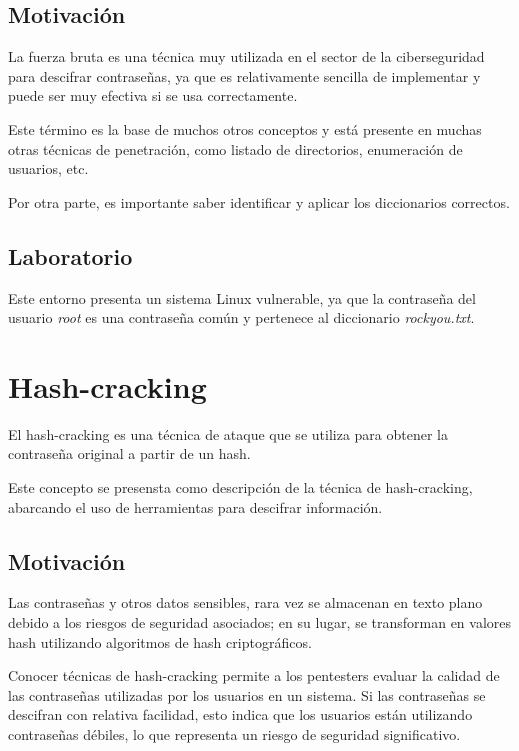         \subsection{Motivación}

            La fuerza bruta es una técnica muy utilizada en el sector de la ciberseguridad para descifrar contraseñas, ya que es relativamente sencilla de implementar y puede ser muy efectiva si se usa correctamente.

            Este término es la base de muchos otros conceptos y está presente en muchas otras técnicas de penetración, como listado de directorios, enumeración de usuarios, etc.

            Por otra parte, es importante saber identificar y aplicar los diccionarios correctos.

        \subsection{Laboratorio}

            Este entorno presenta un sistema Linux vulnerable, ya que la contraseña del usuario \textit{root} es una contraseña común y pertenece al diccionario \textit{rockyou.txt}.


    \section{Hash-cracking}
        \label{sec:hash-cracking}

        El hash-cracking es una técnica de ataque que se utiliza para obtener la contraseña original a partir de un hash.

        Este concepto se presensta como descripción de la técnica de hash-cracking, abarcando el uso de herramientas para descifrar información.

        \subsection{Motivación}

            Las contraseñas y otros datos sensibles, rara vez se almacenan en texto plano debido a los riesgos de seguridad asociados; en su lugar, se transforman en valores hash utilizando algoritmos de hash criptográficos.
            
            Conocer técnicas de hash-cracking permite a los pentesters evaluar la calidad de las contraseñas utilizadas por los usuarios en un sistema. Si las contraseñas se descifran con relativa facilidad, esto indica que los usuarios están utilizando contraseñas débiles, lo que representa un riesgo de seguridad significativo.
            
